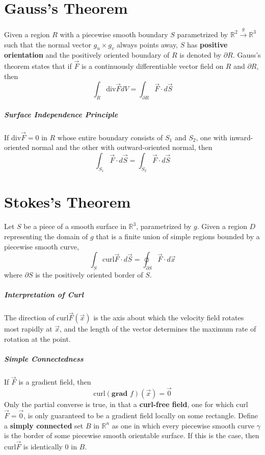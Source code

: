 \documentclass[11pt]{article}
\begin{document}
\section{Gauss's Theorem}
	Given a region $R$ with a piecewise smooth boundary $S$ parametrized by $\mathbb{R}^2 \xrightarrow{g} \mathbb{R}^3$ such that the normal vector $g_u \times g_v$ always points away, $S$ has \textbf{positive orientation} and the positively oriented boundary of $R$ is denoted by $\partial R$. Gauss's theorem states that if $\vec{F}$ is a continuously differentiable vector field on $R$ and $\partial R$, then
	\begin{equation}
		\int_R \text{div} \vec{F} dV = \int_{\partial R} \vec{F} \cdot d\vec{S}
	\end{equation}
	
	\subparagraph{Surface Independence Principle} If div$\vec{F} = 0$ in $R$ whose entire boundary consists of $S_1$ and $S_2$, one with inward-oriented normal and the other with outward-oriented normal, then
		\begin{equation}
			\int_{S_1} \vec{F} \cdot d\vec{S} = \int_{S_2} \vec{F} \cdot d\vec{S}
		\end{equation}
		
\section{Stokes's Theorem}
	Let $S$ be a piece of a smooth surface in $\mathbb{R}^3$, parametrized by $g$. Given a region $D$ representing the domain of $g$ that is a finite union of simple regions bounded by a piecewise smooth curve,
	\begin{equation}
		\int_S \text{curl}\vec{F} \cdot d\vec{S} = \oint_{\partial S} \vec{F} \cdot d\vec{x}
	\end{equation}
	where $\partial S$ is the positively oriented border of $S$.
	
	\subparagraph{Interpretation of Curl} The direction of curl$\vec{F}(\vec{x})$ is the axis about which the velocity field rotates most rapidly at $\vec{x}$, and the length of the vector determines the maximum rate of rotation at the point. 
	
	\subparagraph{Simple Connectedness} If $\vec{F}$ is a gradient field, then 
		\begin{equation}
			\text{curl}(\textbf{grad } f)(\vec{x}) = \vec{0}
		\end{equation}
		Only the partial converse is true, in that a \textbf{curl-free field}, one for which curl$\vec{F} = \vec{0}$, is only guaranteed to be a gradient field locally on some rectangle. Define a \textbf{simply connected} set $B$ in $\mathbb{R}^n$ as one in which every piecewise smooth curve $\gamma$ is the border of some piecewise smooth orientable surface. If this is the case, then curl$\vec{F}$ is identically 0 in $B$.
		
\end{document}
